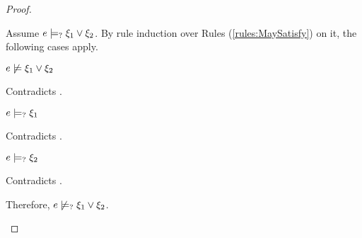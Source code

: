 \begin{proof}
\begin{byCases}
\begin{byCases}
\begin{pfsteps*}
        \end{pfsteps*}
        Assume $e \models_{?} \xi_1 \vee \xi_2$. By rule induction over Rules (\ref{rules:MaySatisfy}) on it, the following cases apply.
        \begin{byCases}
        \item[\text{(\ref{rule:CMSNotVal})}]
            \begin{pfsteps*}
            \item $e \not\models \xi_1 \vee \xi_2$ 
            \end{pfsteps*}
            Contradicts .
        \item[\text{(\ref{rule:CMSOr1})}]
            \begin{pfsteps*}
            \item $e \models_{?} \xi_1$ 
            \end{pfsteps*}
            Contradicts .
        \item[\text{(\ref{rule:CMSOr2})}]
            \begin{pfsteps*}
            \item $e \models_{?} \xi_2$ 
            \end{pfsteps*}
            Contradicts .
        \end{byCases}
        Therefore, $e \not\models_{?} \xi_1 \vee \xi_2$.
        

\end{byCases}
\end{byCases}
\end{proof}

